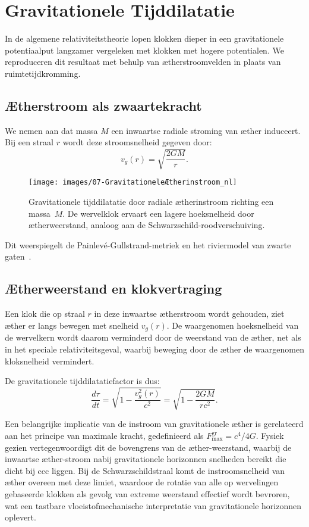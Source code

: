 \section{Gravitationele Tijddilatatie}

In de algemene relativiteitstheorie lopen klokken dieper in een gravitationele potentiaalput langzamer vergeleken met klokken met hogere potentialen. We reproduceren dit resultaat met behulp van ætherstroomvelden in plaats van ruimtetijdkromming.

\subsection*{Ætherstroom als zwaartekracht}

We nemen aan dat massa $M$ een inwaartse radiale stroming van æther induceert. Bij een straal $r$ wordt deze stroomsnelheid gegeven door:
\[
    v_g(r) = \sqrt{\frac{2GM}{r}}.
\]

\begin{figure}[htbp]
    \centering
    \texttt{[image: images/07-GravitationeleÆtherinstroom\_nl]}
    \caption{Gravitationele tijddilatatie door radiale ætherinstroom richting een massa~$M$. De wervelklok ervaart een lagere hoeksnelheid door ætherweerstand, analoog aan de Schwarzschild-roodverschuiving.}
    \label{fig:GravitationeleÆtherinstroom}
\end{figure}

Dit weerspiegelt de Painlevé-Gullstrand-metriek en het riviermodel van zwarte gaten~\cite{Hamilton2004-river}.

\subsection*{Ætherweerstand en klokvertraging}

Een klok die op straal $r$ in deze inwaartse ætherstroom wordt gehouden, ziet æther er langs bewegen met snelheid $v_g(r)$. De waargenomen hoeksnelheid van de wervelkern wordt daarom verminderd door de weerstand van de æther, net als in het speciale relativiteitsgeval, waarbij beweging door de æther de waargenomen kloksnelheid vermindert.

De gravitationele tijddilatatiefactor is dus:
\[
    \frac{d\tau}{dt} = \sqrt{1 - \frac{v_g^2(r)}{c^2}} = \sqrt{1 - \frac{2GM}{rc^2}}. \tag{4}
\]

Een belangrijke implicatie van de instroom van gravitationele æther is gerelateerd aan het principe van maximale kracht, gedefinieerd als $F^{\text{gr}}_{\text{max}} = c^4 /4G$. Fysiek gezien vertegenwoordigt dit de bovengrens van de æther-weerstand, waarbij de inwaartse æther-stroom nabij gravitationele horizonnen snelheden bereikt die dicht bij ccc liggen. Bij de Schwarzschildstraal komt de instroomsnelheid van æther overeen met deze limiet, waardoor de rotatie van alle op wervelingen gebaseerde klokken als gevolg van extreme weerstand effectief wordt bevroren, wat een tastbare vloeistofmechanische interpretatie van gravitationele horizonnen oplevert.

